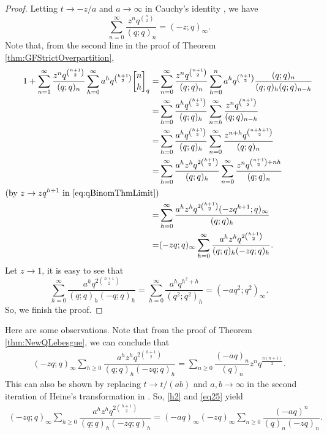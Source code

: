 \documentclass[12pt]{amsart}
\theoremstyle{definition}
\theoremstyle{remark}
\numberwithin{equation}{section}
\begin{document}
\begin{proof}
Letting $t\to -z/a$ and $a\to\infty$ in Cauchy's identity \cite[p. $17$, $(2.2.1)$]{A}, we have
\begin{equation}\label{eq:qBinomThmLimit}
\sum_{n=0}^{\infty}\frac{z^{n}q^{\binom{n}{2}}}{(q;q)_{n}}=(-z;q)_{\infty}.
\end{equation}
Note that, from the second line in the proof of Theorem \ref{thm:GFStrictOverpartition},
\begin{align*}
1+\sum_{n=1}^{\infty}\frac{z^nq^{\binom{n+1}{2}}}{(q;q)_n}\sum_{h=0}^{\infty}a^{h}q^{\binom{h+1}{2}}{n\brack h}_{q}
=&\sum_{n=0}^{\infty}\frac{z^nq^{\binom{n+1}{2}}}{(q;q)_n}\sum_{h=0}^{n}a^{h}q^{\binom{h+1}{2}}\frac{(q;q)_n}{(q;q)_h(q;q)_{n-h}}\\
=&\sum_{h=0}^{\infty}\frac{a^hq^{\binom{h+1}{2}}}{(q;q)_h}\sum_{n=h}^{\infty}\frac{z^{n}q^{\binom{n+1}{2}}}{(q;q)_{n-h}}\\
=&\sum_{h=0}^{\infty}\frac{a^hq^{\binom{h+1}{2}}}{(q;q)_h}\sum_{n=0}^{\infty}\frac{z^{n+h}q^{\binom{n+h+1}{2}}}{(q;q)_{n}}\\
=&\sum_{h=0}^{\infty}\frac{a^hz^hq^{2\binom{h+1}{2}}}{(q;q)_h}\sum_{n=0}^{\infty}\frac{z^{n}q^{\binom{n+1}{2}+nh}}{(q;q)_{n}}\\
\text{(by $z\to zq^{h+1}$ in~\eqref{eq:qBinomThmLimit})}\\
=&\sum_{h=0}^{\infty}\frac{a^hz^hq^{2\binom{h+1}{2}}(-zq^{h+1};q)_{\infty}}{(q;q)_h}\\
=&(-zq;q)_{\infty}\sum_{h=0}^{\infty}\frac{a^hz^hq^{2\binom{h+1}{2}}}{(q;q)_h(-zq;q)_{h}}.
\end{align*}
Let $z\to1$, it is easy to see that
$$\sum_{h=0}^{\infty}\frac{a^hq^{2\binom{h+1}{2}}}{(q;q)_h(-q;q)_{h}}=\sum_{h=0}^{\infty}\frac{a^{h}q^{h^{2}+h}}{(q^2;q^2)_{h}}=(-aq^{2};q^2)_{\infty}.$$
So, we finish the proof.
\end{proof}
Here are some observations. Note that from the proof of Theorem \ref{thm:NewQLebesgue}, we can conclude that
\begin{align}\label{h2}
(-zq;q)_\infty\sum_{h\ge 0}\dfrac{a^h z^h q^{2\binom{h+1}{2}}}{(q;q)_h(-zq;q)_h}=\sum_{n\ge 0}\dfrac{(-aq)_n}{(q)_n}z^n q^{\frac{n(n+1)}{2}}.   
\end{align}
This can also be shown by replacing $t\rightarrow t/(ab)$ and $a, b\rightarrow\infty$ in the second iteration of Heine's transformation in \cite[p. $9$, $(1.2.9)$]{AndrewsBerndt2009}. So, \eqref{h2} and \eqref{eq25} yield 
\begin{align}
(-zq;q)_\infty\sum_{h\ge 0}\dfrac{a^h z^h q^{2\binom{h+1}{2}}}{(q;q)_h(-zq;q)_h}=(-aq)_\infty (-zq)_\infty\sum_{n\ge 0}\dfrac{(-aq)^n}{(q)_n(-zq)_n}.    
\end{align}
\end{document}
